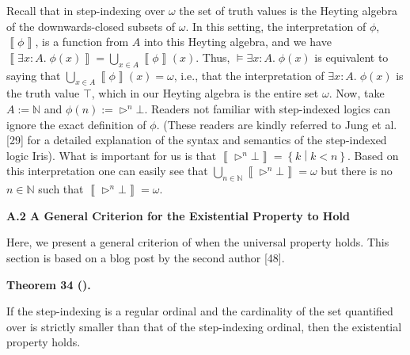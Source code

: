 Recall that in step-indexing over $\omega$ the set of truth values is the Heyting algebra of the downwards-closed subsets of $\omega$. In this setting, the interpretation of $\phi$, $\left\llbracket\phi\right\rrbracket$, is a function from $A$ into this Heyting algebra, and we have $\left\llbracket\exists x:A.\;\phi(x)\right\rrbracket=\bigcup_{x\in A}\left\llbracket\phi\right\rrbracket(x)$. Thus, $\models\exists x:A.\;\phi(x)$ is equivalent to saying that $\bigcup_{x\in A}\left\llbracket\phi\right\rrbracket(x)=\omega$, i.e., that the interpretation of $\exists x:A.\;\phi(x)$ is the truth value $\top$, which in our Heyting algebra is the entire set $\omega$. Now, take $A:=\mathbb{N}$ and $\phi(n):=\rhd^{n}\bot$. Readers not familiar with step-indexed logics can ignore the exact definition of $\phi$. (These readers are kindly referred to Jung et al. [29] for a detailed explanation of the syntax and semantics of the step-indexed logic Iris). What is important for us is that $\left\llbracket\rhd^{n}\bot\right\rrbracket=\left\{k\middle|k<n\right\}$. Based on this interpretation one can easily see that $\bigcup_{n\in\mathbb{N}}\left\llbracket\rhd^{n}\bot\right\rrbracket=\omega$ but there is no $n\in\mathbb{N}$ such that $\left\llbracket\rhd^{n}\bot\right\rrbracket=\omega$.\par
 
 
 
 
\par\medskip\noindent\textbf{A.2 A General Criterion for the Existential Property to Hold}\par
 
 
Here, we present a general criterion of when the universal property holds. This section is based on a blog post by the second author [48].\par
 
 
 
\par\medskip\noindent\textbf{Theorem 34 ().}\par
 
 
If the step-indexing is a regular ordinal and the cardinality of the set quantified over is strictly smaller than that of the step-indexing ordinal, then the existential property holds.\par
 
